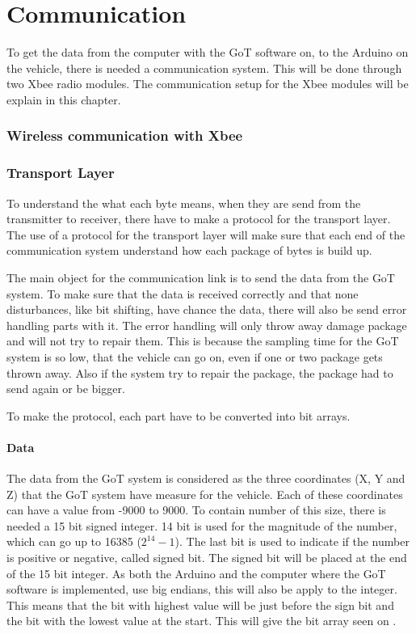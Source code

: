 \chapter{Communication}
To get the data from the computer with the GoT software on, to the Arduino on the vehicle, there is needed a communication system. This will be done through two Xbee radio modules. The communication setup for the Xbee modules will be explain in this chapter.

\subsection{Wireless communication with Xbee}

\subsection{Transport Layer}
To understand the what each byte means, when they are send from the transmitter to receiver, there have to make a protocol for the transport layer. The use of a protocol for the transport layer will make sure that each end of the communication system understand how each package of bytes is build up.

The main object for the communication link is to send the data from the GoT system. To make sure that the data is received correctly and that none disturbances, like bit shifting, have chance the data, there will also be send error handling parts with it. The error handling will only throw  away damage package and will not try to repair them. This is because the sampling time for the GoT system is so low, that the vehicle can go on, even if one or two package gets thrown away. Also if the system try to repair the package, the package had to send again or be bigger.

To make the protocol, each part have to be converted into bit arrays.

\subsubsection{Data}
The data from the GoT system is considered as the three coordinates (X, Y and Z) that the GoT system have measure for the vehicle. Each of these coordinates can have a value from -9000 to 9000. To contain number of this size, there is needed a 15 bit signed integer. 14 bit is used for the magnitude of the number, which can go up to 16385 ($2^{14}-1$). The last bit is used to indicate if the number is positive or negative, called signed bit. The signed bit will be placed at the end of the 15 bit integer. As both the Arduino and the computer where the GoT software is implemented, use big endians, this will also be apply to the integer. This means that the bit with highest value will be just before the sign bit and the bit with the lowest value at the start. This will give the bit array seen on .

